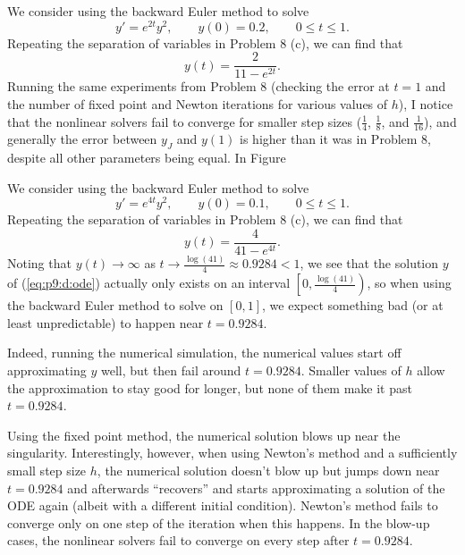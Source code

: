 \documentclass{homework}
\begin{document}
		\question 
		\begin{alphaparts}
			\questionpart We consider using the backward Euler method to solve
			\begin{equation}
				\label{eq:p9:c:ode}
				y' = e^{2t}y^2, \qquad y(0) = 0.2, \qquad 0\le t\le 1.
			\end{equation}
			Repeating the separation of variables in Problem 8 (c), we can find that
			\begin{equation}
				y(t) = \frac{2}{11 - e^{2t}}.
			\end{equation}
			Running the same experiments from Problem 8 (checking the error at $t = 1$ and the number of fixed point and Newton iterations for various values of $h$), I notice that the nonlinear solvers fail to converge for smaller step sizes ($\frac{1}{4}$, $\frac{1}{8}$, and $\frac{1}{16}$), and generally the error between $y_J$ and $y(1)$ is higher than it was in Problem 8, despite all other parameters being equal. In Figure
			
			\begin{figure}[H]
				
			\end{figure}
			
			\questionpart We consider using the backward Euler method to solve
			\begin{equation}
				\label{eq:p9:d:ode}
				y' = e^{4t}y^2, \qquad y(0) = 0.1, \qquad 0\le t\le 1.
			\end{equation}
			Repeating the separation of variables in Problem 8 (c), we can find that
			\begin{equation}
				y(t) = \frac{4}{41 - e^{4t}}.
			\end{equation}
			Noting that $y(t) \to\infty$ as $t\to \frac{\log(41)}{4} \approx 0.9284 < 1$, we see that the solution $y$ of (\ref{eq:p9:d:ode}) actually only exists on an interval $\left[0, \frac{\log(41)}{4}\right)$, so when using the backward Euler method to solve on $[0,1]$, we expect something bad (or at least unpredictable) to happen near $t = 0.9284$.
			
			Indeed, running the numerical simulation, the numerical values start off approximating $y$ well, but then fail around $t = 0.9284$. Smaller values of $h$ allow the approximation to stay good for longer, but none of them make it past $t = 0.9284$. 
			
			Using the fixed point method, the numerical solution blows up near the singularity. Interestingly, however, when using Newton's method and a sufficiently small step size $h$, the numerical solution doesn't blow up but jumps down near $t=0.9284$ and afterwards ``recovers'' and starts approximating a solution of the ODE again (albeit with a different initial condition). Newton's method fails to converge only on one step of the iteration when this happens. In the blow-up cases, the nonlinear solvers fail to converge on every step after $t=0.9284$.
		\end{alphaparts}
\end{document}
